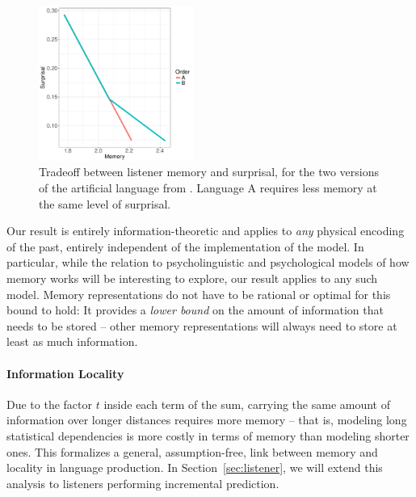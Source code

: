 \documentclass[11pt,letterpaper]{article}
\begin{document}
\begin{figure}
\includegraphics[width=0.45\textwidth]{toy/toy-mem-surp.pdf}
	\caption{Tradeoff between listener memory and surprisal, for the two versions of the artificial language from \cite{fedzechkina-human-2017}. Language A requires less memory at the same level of surprisal.}\label{fig:toy-listener-tradeoff}
\end{figure}










Our result is entirely information-theoretic and applies to \emph{any} physical encoding of the past, entirely independent of the implementation of the model. %
In particular, while the relation to psycholinguistic and psychological models of how memory works will be interesting to explore, our result applies to any such model.
Memory representations do not have to be rational or optimal for this bound to hold:
It provides a \emph{lower bound} on the amount of information that needs to be stored -- other memory representations will always need to store at least as much information.


\paragraph{Information Locality}


Due to the factor $t$ inside each term of the sum, carrying the same amount of information over longer distances requires more memory -- that is, modeling long statistical dependencies is more costly in terms of memory than modeling shorter ones.
This formalizes a general, assumption-free, link between memory and locality in language production.
In Section~\ref{sec:listener}, we will extend this analysis to listeners performing incremental prediction.
\end{document}
